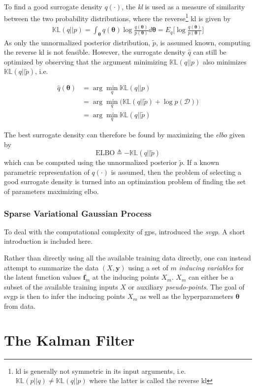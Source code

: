 To find a good surrogate density $q(\cdot)$, the \textit{\acrfull{kl}} is used as a measure of similarity between the two probability distributions, where the reverse\footnote{\acrshort{kl} is generally not symmetric in its input arguments, i.e. $\mathbb{KL}(p || q) \neq \mathbb{KL}(q || p)$ where the latter is called the reverse \acrshort{kl}} \acrshort{kl} is given by
\begin{align}
    \mathbb{KL}(q || p) = \int_{\boldsymbol{\theta}} q(\boldsymbol{\theta}) \log \frac{q(\boldsymbol{\theta})}{p(\boldsymbol{\theta})} d\boldsymbol{\theta} = E_{q} \big[ \log \frac{q(\boldsymbol{\theta})}{p(\boldsymbol{\theta})} \big]\label{eq:kl_qp}
\end{align}
As only the unnormalized posterior distribution, $\tilde{p}$, is assumed known, computing the reverse \acrshort{kl} is not feasible. However, the surrogate density $\hat{q}$ can still be optimized by observing that the argument minimizing $\mathbb{KL}(q || p)$ also minimizes $\mathbb{KL}(q || \tilde{p})$, i.e.

\begin{align}
    \hat{q}(\boldsymbol{\theta}) &= \arg \min_q \mathbb{KL}(q || p)\\ &= \arg \min_q \big(\mathbb{KL}(q || \tilde{p}) + \log p(\mathcal{D})\big) \\&= \arg \min_q \mathbb{KL} (q || \tilde{p})
\end{align}

The best surrogate density can therefore be found by maximizing the \textit{\acrfull{elbo}} given by 
\begin{equation}
    \text{ELBO} \triangleq -\mathbb{KL}(q || \tilde{p})
\end{equation} which can be computed using the unnormalized posterior $\tilde{p}$. If a known parametric representation of $q(\cdot)$ is assumed, then the problem of selecting a good surrogate density is turned into an optimization problem of finding the set of parameters maximizing \acrshort{elbo}. 

\subsubsection{Sparse Variational Gaussian Process}
To deal with the computational complexity of \acrshort{gp}s, \cite{Titsias2008VariationalMS} introduced the \textit{\acrfull{svgp}}. A short introduction is included here. 

Rather than directly using all the available training data directly, one can instead attempt to summarize the data $(X, \boldsymbol{y})$ using a set of $m$ \textit{inducing variables} for the latent function values $\boldsymbol{f}_m$ at the inducing points $X_m$. $X_m$ can either be a subset of the available training inputs $X$ or auxiliary \textit{pseudo-points}. The goal of \acrshort{svgp} is then to infer the inducing points $X_m$ as well as the hyperparameters $\boldsymbol{\theta}$ from data.


\section{The Kalman Filter}

